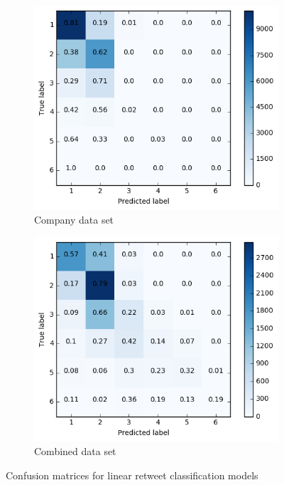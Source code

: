 \begin{figure}[h]
\begin{subfigure}{.5\textwidth}
  \includegraphics[width=.95\linewidth]{img/corp_lin_cm_retweets}
  \caption{Company data set}
  \label{fig:retw_distr_sub3}
\end{subfigure}%
\begin{subfigure}{.5\textwidth}
  \includegraphics[width=.95\linewidth]{img/comb_lin_cm_retweets}
  \caption{Combined data set}
  \label{fig:retw_distr_sub3}
\end{subfigure}%
\caption{Confusion matrices for linear retweet classification models}
\label{fig:lin_cm}
\end{figure}

